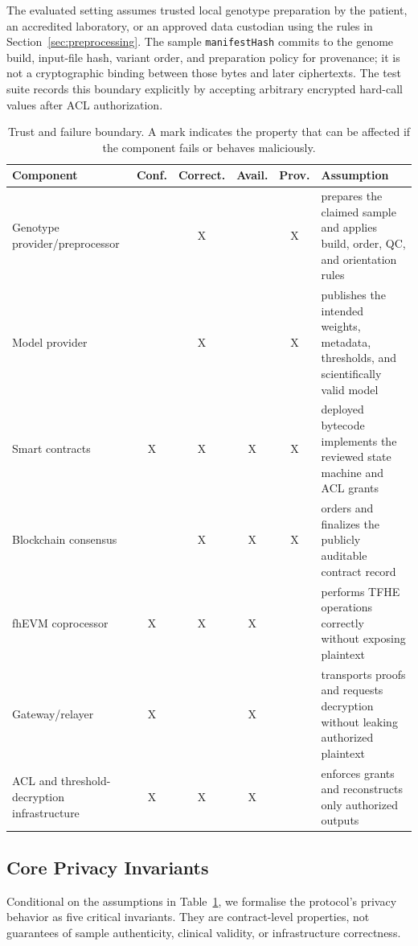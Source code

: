 \documentclass[10pt,twocolumn]{article}
\begin{document}
The evaluated setting assumes trusted local genotype preparation by the patient, an
accredited laboratory, or an approved data custodian using the rules in
Section~\ref{sec:preprocessing}.  The sample \texttt{manifestHash} commits to the genome
build, input-file hash, variant order, and preparation policy for provenance; it is not a
cryptographic binding between those bytes and later ciphertexts.  The test suite records
this boundary explicitly by accepting arbitrary encrypted hard-call values after ACL
authorization.

\begin{table}[t]
\centering
\caption{Trust and failure boundary.  A mark indicates the property that can be affected
if the component fails or behaves maliciously.}
\label{tab:trust_boundary}
\small
\begin{tabularx}{\textwidth}{@{}XccccX@{}}
\toprule
\textbf{Component} & \textbf{Conf.} & \textbf{Correct.} & \textbf{Avail.} & \textbf{Prov.} & \textbf{Assumption} \\
\midrule
Genotype provider/preprocessor &  & X &  & X & prepares the claimed sample and applies build, order, QC, and orientation rules \\
Model provider &  & X &  & X & publishes the intended weights, metadata, thresholds, and scientifically valid model \\
Smart contracts & X & X & X & X & deployed bytecode implements the reviewed state machine and ACL grants \\
Blockchain consensus &  & X & X & X & orders and finalizes the publicly auditable contract record \\
fhEVM coprocessor & X & X & X &  & performs TFHE operations correctly without exposing plaintext \\
Gateway/relayer & X &  & X &  & transports proofs and requests decryption without leaking authorized plaintext \\
ACL and threshold-decryption infrastructure & X & X & X &  & enforces grants and reconstructs only authorized outputs \\
\bottomrule
\end{tabularx}
\end{table}

\subsection{Core Privacy Invariants}

Conditional on the assumptions in Table~\ref{tab:trust_boundary}, we formalise the
protocol's privacy behavior as five critical invariants.  They are contract-level
properties, not guarantees of sample authenticity, clinical validity, or infrastructure
correctness.
\end{document}
